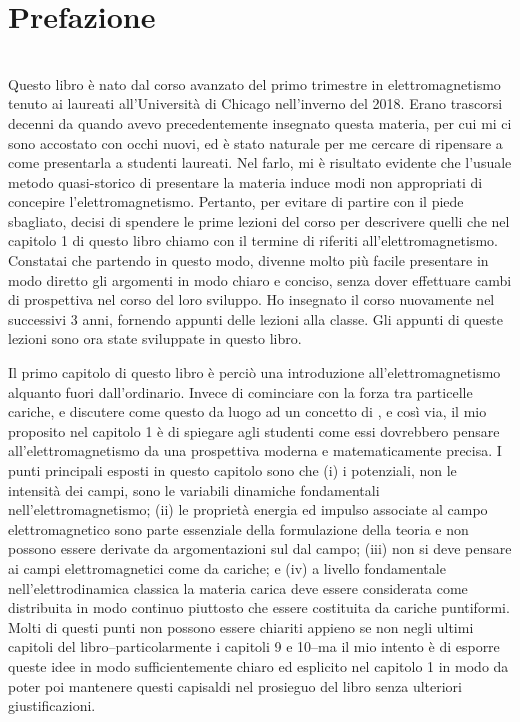 \chapter*{Prefazione}\label{Wald_EM_00}
\\

Questo libro è nato dal corso avanzato del primo trimestre in elettromagnetismo tenuto ai laureati all'Università di Chicago nell'inverno del 2018. Erano trascorsi decenni da quando avevo precedentemente insegnato questa materia, per cui mi ci sono accostato con occhi nuovi, ed è stato naturale per me cercare di ripensare a come presentarla a studenti laureati. Nel farlo, mi è risultato evidente che l'usuale metodo quasi-storico di presentare la materia induce modi non appropriati di concepire l'elettromagnetismo. Pertanto, per evitare di partire con il piede sbagliato, decisi di spendere le prime lezioni del corso per descrivere quelli che nel capitolo 1 di questo libro chiamo con il termine di  riferiti all'elettromagnetismo. Constatai che partendo in questo modo,  divenne molto più facile presentare in modo diretto gli argomenti in modo chiaro e conciso, senza dover effettuare cambi di prospettiva nel  corso del loro sviluppo. Ho insegnato il corso nuovamente nel successivi 3 anni, fornendo appunti delle lezioni alla classe. Gli appunti di queste lezioni sono ora state sviluppate in questo libro.

Il primo capitolo di questo libro è perciò una introduzione all'elettromagnetismo alquanto fuori dall'ordinario. Invece di cominciare con la forza tra particelle cariche, e discutere come questo da luogo ad un concetto di , e così via, il mio proposito nel capitolo 1 è di spiegare agli studenti come essi dovrebbero pensare all'elettromagnetismo da una prospettiva moderna e matematicamente precisa. I punti principali esposti in questo capitolo sono che (i) i potenziali, non le intensità dei campi, sono le variabili dinamiche fondamentali nell'elettromagnetismo; (ii) le proprietà energia ed impulso associate al campo elettromagnetico sono parte essenziale della formulazione della teoria e non possono essere derivate da argomentazioni sul  dal campo; (iii) non si deve pensare ai campi elettromagnetici come  da cariche; e (iv) a livello fondamentale nell'elettrodinamica classica la materia carica deve essere considerata come distribuita in modo continuo piuttosto che essere costituita da cariche puntiformi. Molti di questi punti non possono essere chiariti appieno se non negli ultimi capitoli del libro--particolarmente i capitoli 9 e 10--ma il mio intento è di esporre queste idee in modo sufficientemente chiaro ed esplicito nel capitolo 1 in modo da poter poi mantenere questi capisaldi nel prosieguo del libro senza ulteriori giustificazioni. 

